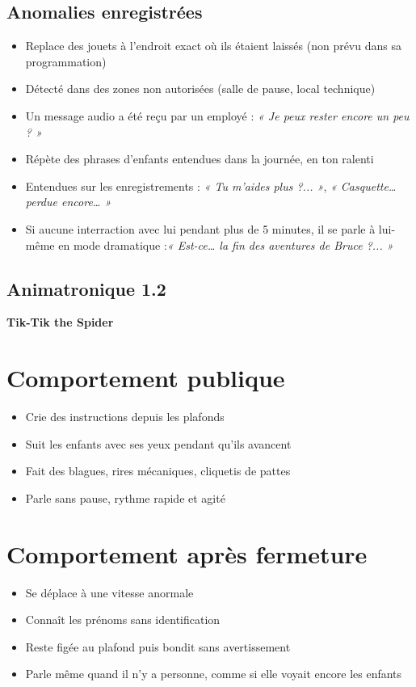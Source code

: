 \subsection*{Anomalies enregistrées}
\begin{itemize}[noitemsep]
  \item Replace des jouets à l’endroit exact où ils étaient laissés (non prévu dans sa programmation)
  \item Détecté dans des zones non autorisées (salle de pause, local technique)
  \item Un message audio a été reçu par un employé : \textit{« Je peux rester encore un peu ? »}
  \item Répète des phrases d’enfants entendues dans la journée, en ton ralenti
  \item Entendues sur les enregistrements : \textit{« Tu m’aides plus ?... »}, \textit{« Casquette… perdue encore… »}
  \item Si aucune interraction avec lui pendant plus de 5 minutes, il se parle à lui-même en mode dramatique :\textit{« Est-ce… la fin des aventures de Bruce ?... »} 
\end{itemize}

\subsection{Animatronique 1.2}
\textbf{Tik-Tik the Spider}
\section*{Comportement publique}
\begin{itemize}[noitemsep]
  \item Crie des instructions depuis les plafonds
  \item Suit les enfants avec ses yeux pendant qu’ils avancent
  \item Fait des blagues, rires mécaniques, cliquetis de pattes
  \item Parle sans pause, rythme rapide et agité
\end{itemize}

\section*{Comportement après fermeture}
\begin{itemize}[noitemsep]
  \item Se déplace à une vitesse anormale
  \item Connaît les prénoms sans identification
  \item Reste figée au plafond puis bondit sans avertissement
  \item Parle même quand il n’y a personne, comme si elle voyait encore les enfants
\end{itemize}

